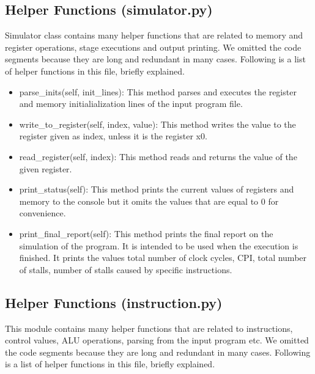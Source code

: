\subsection{Helper Functions (simulator.py)}
Simulator class contains many helper functions that are related to memory and register operations, stage executions and output printing. We omitted the code segments because they are long and redundant in many cases. Following is a list of helper functions in this file, briefly explained.

\begin{itemize}
    \item parse\_inits(self, init\_lines): This method parses and executes the register and memory initialialization lines of the input program file.
    \item write\_to\_register(self, index, value): This method writes the value to the register given as index, unless it is the register x0.
    \item read\_register(self, index): This method reads and returns the value of the given register.
    \item print\_status(self): This method prints the current values of registers and memory to the console but it omits the values that are equal to 0 for convenience.
    \item print\_final\_report(self): This method prints the final report on the simulation of the program. It is intended to be used when the execution is finished. It prints the values total number of clock cycles, CPI, total number of stalls, number of stalls caused by specific instructions.
    
    
\end{itemize}


\subsection{Helper Functions (instruction.py)}
This module contains many helper functions that are related to instructions, control values, ALU operations, parsing from the input program etc. We omitted the code segments because they are long and redundant in many cases. Following is a list of helper functions in this file, briefly explained.

